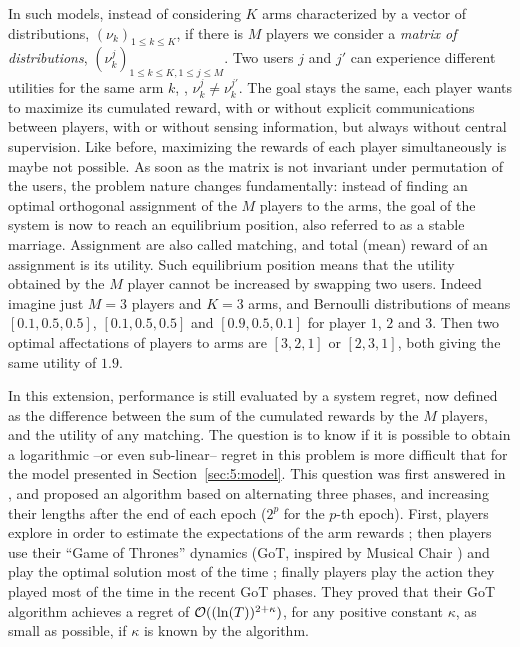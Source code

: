 In such models, instead of considering $K$ arms characterized by a vector of distributions, $(\nu_k)_{1\leq k \leq K}$, if there is $M$ players we consider a \emph{matrix of distributions}, $(\nu_k^j)_{1 \leq k \leq K, 1 \leq j \leq M}$. Two users $j$ and $j'$ can experience different utilities for the same arm $k$, \ie, $\nu_k^{j} \neq \nu_k^{j'}$.
The goal stays the same, each player wants to maximize its cumulated reward, with or without explicit communications between players, with or without sensing information, but always without central supervision.
%
Like before, maximizing the rewards of each player simultaneously is maybe not possible.
As soon as the matrix is not invariant under permutation of the users, the problem nature changes fundamentally:
instead of finding an optimal orthogonal assignment of the $M$ players to the \Mbest{} arms,
the goal of the system is now to reach an equilibrium position, also referred to as a stable marriage.
Assignment are also called matching, and total (mean) reward of an assignment is its utility.
Such equilibrium position means that the utility obtained by the $M$ player cannot be increased by swapping two users.
Indeed imagine just $M=3$ players and $K=3$ arms, and Bernoulli distributions of means $[0.1, 0.5, 0.5]$, $[0.1, 0.5, 0.5]$ and $[0.9, 0.5, 0.1]$ for player $1$, $2$ and $3$. Then two optimal affectations of players to arms are $[3,2,1]$ or $[2,3,1]$, both giving the same utility of $1.9$.

In this extension, performance is still evaluated by a system regret, now defined as the difference between the sum of the cumulated rewards by the $M$ players, and the utility of any matching.
The question is to know if it is possible to obtain a logarithmic --or even sub-linear-- regret in this problem is more difficult that for the model presented in Section~\ref{sec:5:model}.
This question was first answered in \cite{Bistritz18}, and proposed an algorithm based on alternating three phases, and increasing their lengths after the end of each epoch ($2^p$ for the $p$-th epoch).
First, players explore in order to estimate the expectations of the arm rewards ; then players use their ``Game of Thrones'' dynamics (GoT, inspired by Musical Chair \cite{Rosenski16}) and play the optimal solution most of the time ; finally players play the action they played most of the time in the recent GoT phases.
They proved that their GoT algorithm achieves a regret of $\mathcal{O}((\ln(T))^{2+\kappa})$, for any positive constant $\kappa$, as small as possible, if $\kappa$ is known by the algorithm.

